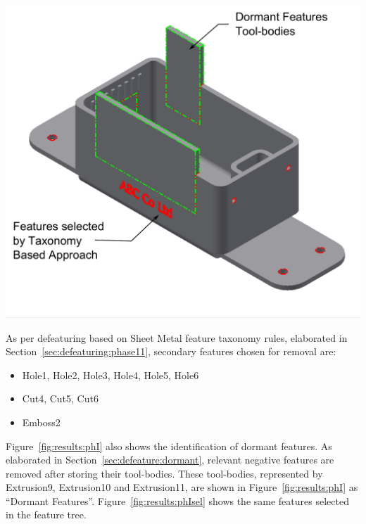 \begin{minipage}{\linewidth}
\begin{minipage}[c]{0.62\linewidth}
\includegraphics[width=\linewidth,valign=t]{../Common/images/SheetMetal_Medium_Enclosure_PhaseISelections_3}
 \label{fig:results:phI}

As per defeaturing based on Sheet Metal feature taxonomy rules, elaborated in Section~\ref{sec:defeaturing:phase11}, secondary features chosen for removal are:

\begin{itemize}[noitemsep,topsep=2pt,parsep=2pt,partopsep=2pt]
\item Hole1, Hole2, Hole3, Hole4, Hole5, Hole6
\item Cut4, Cut5, Cut6
\item Emboss2
\end{itemize}

Figure~\ref{fig:results:phI} also shows the identification of dormant features. As elaborated in Section~\ref{sec:defeature:dormant}, relevant negative features are removed after storing their tool-bodies. These tool-bodies, represented by Extrusion9, Extrusion10 and Extrusion11, are shown in Figure~\ref{fig:results:phI} as ``Dormant Features''. Figure~\ref{fig:results:phIsel} shows the same features selected in the feature tree.


\end{minipage}
\end{minipage}
